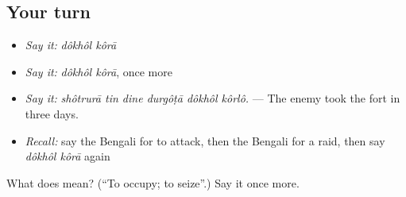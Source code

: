 \subsection*{Your turn}
\begin{itemize}
\raggedright
  \item \emph{Say it:} \emph{dôkhôl kôrā}
  \item \emph{Say it:} \emph{dôkhôl kôrā}, once more
  \item \emph{Say it:} \emph{shôtrurā tin dine durgôṭā dôkhôl kôrlô.} — The enemy took the fort in three days.
  \item \emph{Recall:} say the Bengali for to attack, then the Bengali for a raid, then say \emph{dôkhôl kôrā} again
\end{itemize}

\begin{tcolorbox}[breakable,colback=teal!4,colframe=teal!35!black,title={Before you move on}]
What does   mean? (\textquotedblleft{}To occupy; to seize\textquotedblright{}.) Say it once more.
\end{tcolorbox}
